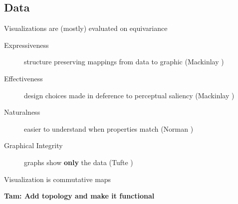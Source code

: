 \subsection{Data}

\begin{frame}{Visualizations are (mostly) evaluated on equivariance}
    \begin{description}
        \item[Expressiveness] structure preserving mappings from data to graphic (Mackinlay \cite{mackinlayAutomatingDesignGraphical1986})
        \item[Effectiveness] design choices made in deference to perceptual saliency (Mackinlay \cite{clevelandResearchStatisticalGraphics1987,clevelandGraphicalPerceptionTheory1984,chambersGraphicalMethodsData1983a, munznerVisualizationAnalysisDesign2014})
        \item[Naturalness] easier to understand when properties match (Norman \cite{norman_things_smart})
        \item[Graphical Integrity] graphs show \textbf{only} the data (Tufte \cite{tufteVisualDisplayQuantitative2001})
    \end{description}
\end{frame}


\begin{frame}{Visualization is commutative maps}

    \pause
    \begin{center}
        \textbf{Tam: Add topology and make it functional}
    \end{center}
\end{frame}


